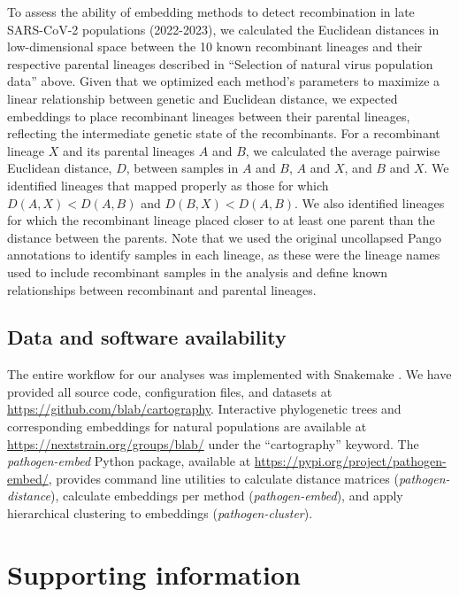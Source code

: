 \documentclass[10pt,letterpaper]{article}
\begin{document}
To assess the ability of embedding methods to detect recombination in late SARS-CoV-2 populations (2022-2023), we calculated the Euclidean distances in low-dimensional space between the 10 known recombinant lineages and their respective parental lineages described in ``Selection of natural virus population data'' above.
Given that we optimized each method's parameters to maximize a linear relationship between genetic and Euclidean distance, we expected embeddings to place recombinant lineages between their parental lineages, reflecting the intermediate genetic state of the recombinants.
For a recombinant lineage $X$ and its parental lineages $A$ and $B$, we calculated the average pairwise Euclidean distance, $D$, between samples in $A$ and $B$, $A$ and $X$, and $B$ and $X$.
We identified lineages that mapped properly as those for which $D(A, X) < D(A, B)$ and $D(B, X) < D(A, B)$.
We also identified lineages for which the recombinant lineage placed closer to at least one parent than the distance between the parents.
Note that we used the original uncollapsed Pango annotations to identify samples in each lineage, as these were the lineage names used to include recombinant samples in the analysis and define known relationships between recombinant and parental lineages.

\subsection*{Data and software availability}

The entire workflow for our analyses was implemented with Snakemake \cite{molder_2021}.
We have provided all source code, configuration files, and datasets at \href{https://github.com/blab/cartography}{https://github.com/blab/cartography}.
Interactive phylogenetic trees and corresponding embeddings for natural populations are available at \href{https://nextstrain.org/groups/blab/}{https://nextstrain.org/groups/blab/} under the ``cartography'' keyword.
The \textit{pathogen-embed} Python package, available at \href{https://pypi.org/project/pathogen-embed/}{https://pypi.org/project/pathogen-embed/}, provides command line utilities to calculate distance matrices (\textit{pathogen-distance}), calculate embeddings per method (\textit{pathogen-embed}), and apply hierarchical clustering to embeddings (\textit{pathogen-cluster}).

\section*{Supporting information}
\end{document}
